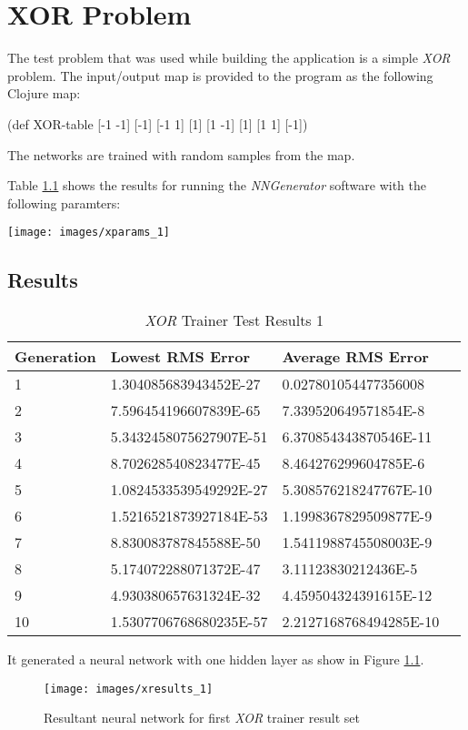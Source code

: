 \chapter[XOR Problem]{XOR Problem}
The test problem that was used while building the application is a
simple {\it XOR} problem. 
The input/output map is provided to the program as the following
Clojure map: 

(def XOR-table {[-1 -1] [-1]
                [-1 1] [1]
                [1 -1] [1]
                [1 1] [-1]})

The networks are trained with random samples from the map.

Table \ref{xor1} shows the results for running the {\it NNGenerator}
software with the following paramters: 

\begin{center}
\texttt{[image: images/xparams\_1]}
\end{center}

\section{Results}
\begin{center}
    \begin{longtable}{ | l | l | l | l |}
      \caption{{\it XOR} Trainer Test Results 1} \label{xor1} \\
    \hline
    Generation & Lowest RMS Error & Average RMS Error \\ \hline
1 &	1.304085683943452E-27 &	0.027801054477356008 \\ \hline
2 &	7.596454196607839E-65 &	7.339520649571854E-8 \\ \hline
3 &	5.3432458075627907E-51 &	6.370854343870546E-11 \\ \hline
4 &	8.702628540823477E-45 &	8.464276299604785E-6 \\ \hline
5 &	1.0824533539549292E-27 &	5.308576218247767E-10 \\ \hline
6 &	1.5216521873927184E-53 &	1.1998367829509877E-9 \\ \hline
7 &	8.830083787845588E-50 &	1.5411988745508003E-9 \\ \hline
8 &	5.174072288071372E-47 &	3.11123830212436E-5 \\ \hline
9 &	4.930380657631324E-32 &	4.459504324391615E-12 \\ \hline
10 &	1.5307706768680235E-57 &	2.2127168768494285E-10  \\ \hline  
    \end{longtable}
\end{center}

It generated a neural network with one hidden layer as show in Figure \ref{xresults_1}.

\begin{figure}[h!]
  \centering
  \texttt{[image: images/xresults\_1]}
  \caption{Resultant neural network for first {\it XOR} trainer result set}
  \label{xresults_1}
\end{figure}
